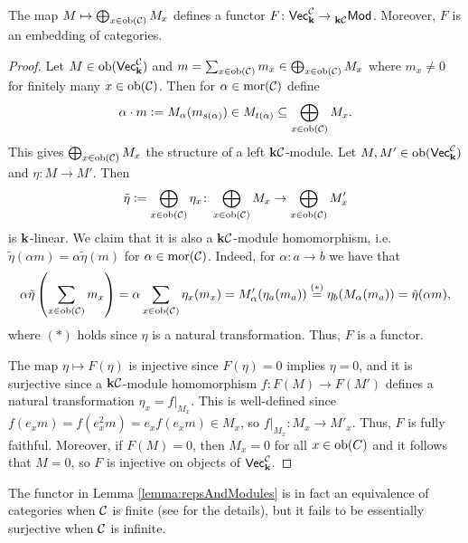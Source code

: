 \begin{lemma}\label{lemma:repsAndModules}
    The map $M\mapsto\bigoplus_{x\in\operatorname{ob}(\mathcal{C})}M_x$  defines a functor $F\colon \normalfont\mathsf{Vec}_{\mathbf{k}}^{\mathcal{C}}\to\prescript{}{\mathbf{k}\mathcal{C}}{\normalfont\mathsf{Mod}}_{}$.
    Moreover, $F$ is an embedding of categories.
\end{lemma}
\begin{proof}
    Let $M\in\operatorname{ob}(\normalfont\mathsf{Vec}_{\mathbf{k}}^{\mathcal{C}})$ and $m=\sum_{x\in\operatorname{ob}(\mathcal{C})}m_x\in\bigoplus_{x\in\operatorname{ob}(\mathcal{C})}M_x$ where $m_x\neq 0$ for finitely many $x\in\operatorname{ob}(\mathcal{C})$.
    Then for $\alpha\in\operatorname{mor}(\mathcal{C})$ define 
    \[ \alpha\cdot m\vcentcolon= M_\alpha(m_{s(\alpha)})\in M_{t(\alpha)}\subseteq \bigoplus_{x\in\operatorname{ob}(\mathcal{C})}M_x.\]
    This gives $\bigoplus_{x\in\operatorname{ob}(\mathcal{C})}M_x$ the structure of a left $\mathbf{k}\mathcal{C}$-module.
    Let $M,M'\in\operatorname{ob}(\normalfont\mathsf{Vec}_{\mathbf{k}}^{\mathcal{C}})$ and $\eta\colon M\to M'$. Then
    \[ \tilde{\eta}\vcentcolon= \bigoplus_{x\in\operatorname{ob}(\mathcal{C})}\eta_x\colon \bigoplus_{x\in\operatorname{ob}(\mathcal{C})}M_x\to \bigoplus_{x\in\operatorname{ob}(\mathcal{C})}M'_x \]
    is $\mathbf{k}$-linear. 
    We claim that it is also a $\mathbf{k}\mathcal{C}$-module homomorphism, i.e. $\tilde{\eta}(\alpha m)=\alpha\tilde{\eta}(m)$ for $\alpha\in\operatorname{mor}(\mathcal{C})$.
    Indeed, for $\alpha\colon a\to b$ we have that
    \[ \alpha\tilde{\eta}\left(\sum_{x\in\operatorname{ob}(\mathcal{C})}m_x\right)=\alpha\sum_{x\in\operatorname{ob}(\mathcal{C})}\eta_x(m_x)=M'_\alpha(\eta_a(m_a))\stackrel{(*)}{=}\eta_b(M_\alpha(m_a))=\tilde{\eta}(\alpha m), \]
    where $(*)$ holds since $\eta$ is a natural transformation.
    Thus, $F$ is a functor.

    The map $\eta\mapsto F(\eta)$ is injective since $F(\eta)=0$ implies $\eta=0$, and it is surjective since a $\mathbf{k}\mathcal{C}$-module homomorphism $f\colon F(M)\to F(M')$ defines a natural transformation $\eta_x=f\vert_{M_x}$.
    This is well-defined since $f(e_x m)=f(e_x^2 m)=e_x f(e_x m)\in M_x$, so $f\vert_{M_x}\colon M_x\to M'_x$.
    Thus, $F$ is fully faithful.
    Moreover, if $F(M)=0$, then $M_x=0$ for all $x\in\operatorname{ob}(C)$ and it follows that $M=0$, so $F$ is injective on objects of $\normalfont\mathsf{Vec}_{\mathbf{k}}^{\mathcal{C}}$.
\end{proof}
\begin{remark}
    The functor in Lemma \ref{lemma:repsAndModules} is in fact an equivalence of categories when $\mathcal{C}$ is finite (see \cite[Theorem III.1.6]{assemSkowronskiSimson_2006} for the details), but it fails to be essentially surjective when $\mathcal{C}$ is infinite.
\end{remark}
